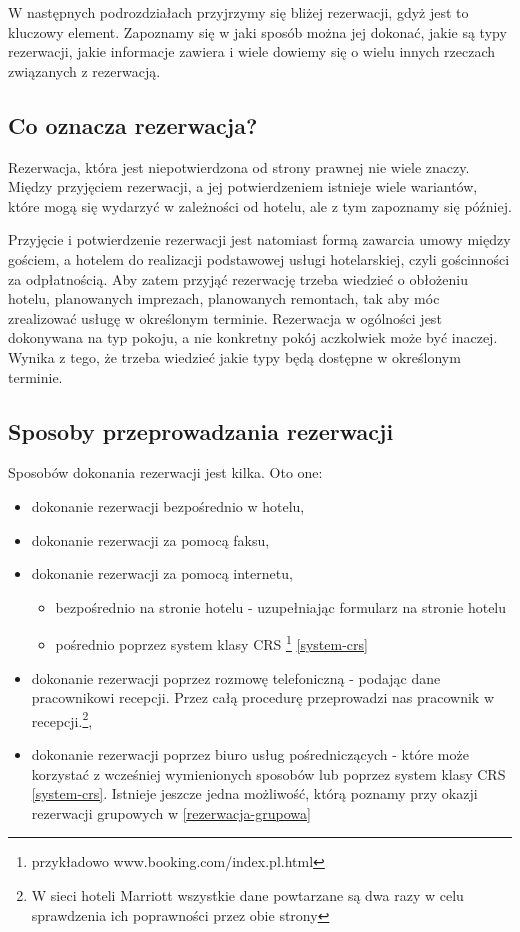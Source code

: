 \documentclass[a4paper,onecolumn,oneside,11pt,wide,floatssmall]{mwrep}
\theoremstyle{definition}
\theoremstyle{plain}%
\theoremstyle{remark}
\begin{document}
W następnych podrozdziałach przyjrzymy się bliżej rezerwacji, gdyż jest to 
kluczowy element. Zapoznamy się w jaki sposób można jej dokonać, jakie są 
typy rezerwacji, jakie informacje zawiera i wiele dowiemy się o wielu innych 
rzeczach związanych z rezerwacją.

\subsection{Co oznacza rezerwacja?}
Rezerwacja, która jest niepotwierdzona od strony prawnej nie wiele znaczy. 
Między przyjęciem rezerwacji, a jej potwierdzeniem istnieje wiele wariantów, 
które mogą się wydarzyć w zależności od hotelu, ale z tym zapoznamy się 
później. 

Przyjęcie i potwierdzenie rezerwacji jest natomiast formą zawarcia umowy 
między gościem, a hotelem do realizacji podstawowej usługi hotelarskiej, 
czyli gościnności za odpłatnością. Aby zatem przyjąć rezerwację trzeba 
wiedzieć o obłożeniu hotelu, planowanych imprezach, planowanych remontach, 
tak aby móc zrealizować usługę w określonym terminie. Rezerwacja w ogólności 
jest dokonywana na typ pokoju, a nie konkretny pokój aczkolwiek może być 
inaczej. Wynika z tego, że trzeba wiedzieć jakie typy będą dostępne w 
określonym terminie.

\subsection{Sposoby przeprowadzania rezerwacji}
Sposobów dokonania rezerwacji jest kilka. Oto one:
\begin{itemize}
  \item dokonanie rezerwacji bezpośrednio w hotelu,
  \item dokonanie rezerwacji za pomocą faksu,
  \item dokonanie rezerwacji za pomocą internetu,
  \begin{itemize}
     \item bezpośrednio na stronie hotelu - uzupełniając formularz na 
     stronie hotelu
     \item pośrednio poprzez system klasy CRS \footnote{przykładowo 
     www.booking.com/index.pl.html} \ref{system-crs}
  \end{itemize}
  \item dokonanie rezerwacji poprzez rozmowę telefoniczną - podając dane 
  pracownikowi recepcji. Przez całą procedurę przeprowadzi nas pracownik w 
  recepcji.\footnote{W sieci hoteli Marriott wszystkie dane powtarzane są 
  dwa razy w celu sprawdzenia ich poprawności przez obie strony},
  \item dokonanie rezerwacji poprzez biuro usług pośredniczących - które  
  może korzystać z wcześniej wymienionych sposobów lub poprzez system klasy 
  CRS \ref{system-crs}. Istnieje jeszcze jedna możliwość, którą poznamy przy 
  okazji rezerwacji grupowych w \ref{rezerwacja-grupowa}
\end{itemize}
\end{document}
